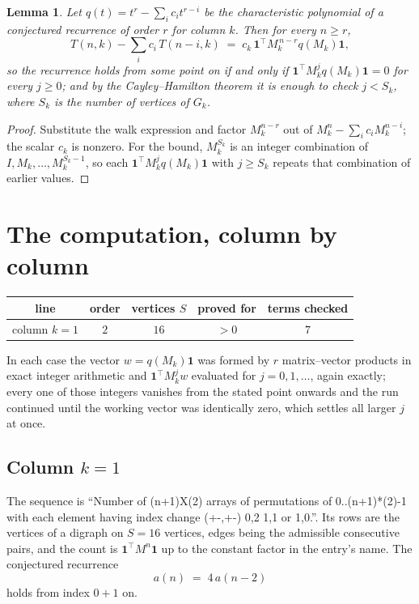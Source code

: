 \documentclass[11pt,a4paper]{article}
\theoremstyle{plain}
\newtheorem{lemma}[theorem]{Lemma}
\theoremstyle{definition}
\begin{document}
\begin{lemma}\label{lem:crit}
Let $q(t)=t^{r}-\sum_i c_it^{r-i}$ be the characteristic polynomial of a conjectured
recurrence of order $r$ for column $k$. Then for every $n\ge r$,
\[
T(n,k)-\sum_i c_i\,T(n-i,k)\;=\;c_k\,\mathbf{1}^{\!\top}M_k^{\,n-r}q(M_k)\mathbf{1},
\]
so the recurrence holds from some point on if and only if
$\mathbf{1}^{\!\top}M_k^{j}q(M_k)\mathbf{1}=0$ for every $j\ge0$; and by the
Cayley--Hamilton theorem it is enough to check $j<S_k$, where $S_k$ is the number of vertices
of $G_k$.
\end{lemma}

\begin{proof}
Substitute the walk expression and factor $M_k^{n-r}$ out of $M_k^{n}-\sum_ic_iM_k^{n-i}$;
the scalar $c_k$ is nonzero. For the bound, $M_k^{S_k}$ is an integer combination of
$I,M_k,\dots,M_k^{S_k-1}$, so each $\mathbf{1}^{\!\top}M_k^{j}q(M_k)\mathbf{1}$ with
$j\ge S_k$ repeats that combination of earlier values.
\end{proof}

\section{The computation, column by column}

\begin{center}
\begin{tabular}{ccccc}
line & order & vertices $S$ & proved for & terms checked \\ \hline
column $k$$=1$ & $2$ & $16$ & $>0$ & $7$ \\
\end{tabular}
\end{center}

In each case the vector $w=q(M_k)\mathbf{1}$ was formed by $r$ matrix--vector products in
exact integer arithmetic and $\mathbf{1}^{\!\top}M_k^{j}w$ evaluated for $j=0,1,\dots$,
again exactly; every one of those integers vanishes from the stated point onwards and the run
continued until the working vector was identically zero, which settles all larger $j$ at once.

\subsection*{Column $k$$=1$}
The sequence is ``Number of (n+1)X(2) arrays of permutations of 0..(n+1)*(2)-1 with each element having index change (+-,+-) 0,2 1,1 or 1,0.''. Its rows are the vertices of a digraph on
$S=16$ vertices, edges being the admissible consecutive pairs, and the count is
$\mathbf{1}^{\!\top}M^{n}\mathbf{1}$ up to the constant factor in the entry's name.
The conjectured recurrence
\[
a(n)\;=\;4\,a(n-2)
\]
holds from index $0+1$ on.
\end{document}
